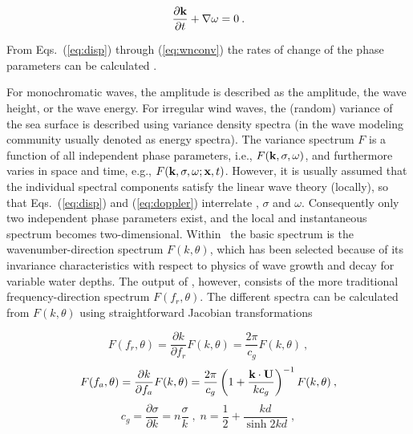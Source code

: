 \begin{equation}
\frac{\partial {\mbox{\bf k}}}{\partial t} + \nabla \omega = 0 \: .
\label{eq:wnconv}
\end{equation}

\noindent
From Eqs.~(\ref{eq:disp}) through (\ref{eq:wnconv}) the rates of change of the
phase parameters can be calculated \citep[e.g.,][equations not reproduced
here]{rep:Chr82,bk:Mei83,tol:JPO90}.

For monochromatic waves, the amplitude is described as the amplitude, the wave
height, or the wave energy. For irregular wind waves, the (random) variance of
the sea surface is described using variance density spectra (in the wave
modeling community usually denoted as energy spectra). The variance spectrum
$F$ is a function of all independent phase parameters, i.e.,
$F({\mbox{\bf k}},\sigma,\omega)$, and furthermore varies in space and time, e.g.,
$F({\mbox{\bf k}},\sigma,\omega ;\mbox{\bf x},t)$. However, it is usually assumed that the
individual spectral components satisfy the linear wave theory (locally), so
that Eqs.~(\ref{eq:disp}) and (\ref{eq:doppler}) interrelate {\bk}, $\sigma$
and $\omega$. Consequently only two independent phase parameters exist, and
the local and instantaneous spectrum becomes two-dimensional. Within \ws\ the
basic spectrum is the wavenumber-direction spectrum $F(k,\theta)$, which has
been selected because of its invariance characteristics with respect to
physics of wave growth and decay for variable water depths. The output of \ws,
however, consists of the more traditional frequency-direction spectrum
$F(f_r,\theta)$. The different spectra can be calculated from $F(k,\theta)$
using straightforward Jacobian transformations


\begin{equation}
F(f_r,\theta) = \frac{\partial k}{\partial f_r} F(k,\theta) =
\frac{2\pi}{c_g} F(k,\theta) \: ,
\label{eq:jac_fr}
\end{equation}
\begin{equation}
F(f_a,\theta) = \frac{\partial k}{\partial f_a} F(k,\theta) =
\frac{2\pi}{c_g}
\left ( 1 + \frac{{\mbox{\bf k}}\cdot{\bf U}}{k c_g}\right )^{-1}
F(k,\theta) \: ,
\label{eq:jac_fa}
\end{equation}
\begin{equation}
c_g = \frac{\partial \sigma}{\partial k} = n \frac{\sigma}{k}
\; , \;
n = \frac{1}{2} + \frac{kd}{\sinh 2kd} \; ,
\label{eq:cg}
\end{equation}

